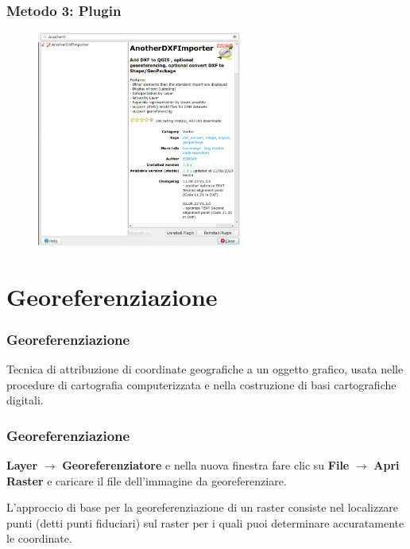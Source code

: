 \documentclass{beamer}
\begin{document}
{\begin{frame}
\end{frame}

\begin{frame}
  \frametitle{Metodo 3: Plugin}
   
   \begin{figure}[h]
        \centering
        \includegraphics[width=0.6\textwidth]{pics/importer.png} 
    \end{figure}
    
\end{frame} 


\section{Georeferenziazione}

\begin{frame}
    \frametitle{Georeferenziazione}
    Tecnica di attribuzione di coordinate geografiche a un oggetto grafico, usata nelle procedure di cartografia computerizzata e nella costruzione di basi cartografiche digitali.
\end{frame}

 \begin{frame}
   \frametitle{Georeferenziazione}
    \textbf{Layer} $\rightarrow$  \textbf{Georeferenziatore}
    e nella nuova finestra fare clic su  \textbf{File} $\rightarrow$ \textbf{Apri Raster} e caricare il file dell'immagine da georeferenziare.

    L’approccio di base per la georeferenziazione di un raster consiste nel localizzare punti (detti punti fiduciari) sul raster per i quali puoi determinare accuratamente le coordinate.
	   
\end{frame} 

}
\end{document}
